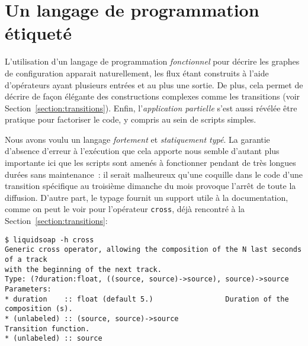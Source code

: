 \documentclass[twoside]{article}
\theoremstyle{plain}
\theoremstyle{definition}
\theoremstyle{remark}
\begin{document}



\section{Un langage de programmation étiqueté}
\label{sec:lang}


L'utilisation d'un langage de programmation \emph{fonctionnel} pour décrire les
graphes de configuration apparait naturellement, les flux étant construits à
l'aide d'opérateurs ayant plusieurs entrées et au plus une sortie. De plus, cela
permet de décrire de façon élégante des constructions complexes comme
les transitions (voir Section~\ref{section:transitions}).
Enfin,
l'\emph{application partielle} s'est aussi révélée être pratique pour factoriser
le code, y compris au sein de scripts simples.

Nous avons voulu un langage \emph{fortement} et \emph{statiquement typé}.
La garantie d'absence d'erreur à l'exécution que cela apporte nous semble
d'autant plus importante ici que les scripts sont amenés à fonctionner pendant de
très longues durées sans maintenance~: il serait malheureux qu'une coquille dans
le code d'une transition spécifique au troisième dimanche du mois provoque
l'arrêt de toute la diffusion.
D'autre part, le typage fournit un support utile à la documentation,
comme on peut le voir pour l'opérateur \verb.cross.,
déjà rencontré à la Section~\ref{section:transitions}:
\begin{verbatim}
$ liquidsoap -h cross
Generic cross operator, allowing the composition of the N last seconds of a track
with the beginning of the next track.
Type: (?duration:float, ((source, source)->source), source)->source
Parameters:
* duration    :: float (default 5.)                 Duration of the composition (s).
* (unlabeled) :: (source, source)->source                       Transition function.
* (unlabeled) :: source
\end{verbatim}
\end{document}
